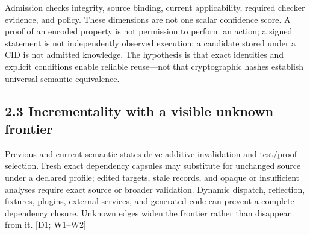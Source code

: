 Admission checks integrity, source binding, current applicability, required checker evidence, and
policy. These dimensions are not one scalar confidence score. A proof of an encoded property is
not permission to perform an action; a signed statement is not independently observed execution; a
candidate stored under a CID is not admitted knowledge. The hypothesis is that exact identities and
explicit conditions enable reliable reuse—not that cryptographic hashes establish universal semantic
equivalence.

\subsection*{2.3 Incrementality with a visible unknown frontier}

Previous and current semantic states drive additive invalidation and test/proof selection. Fresh exact
dependency capsules may substitute for unchanged source under a declared profile; edited targets,
stale records, and opaque or insufficient analyses require exact source or broader validation. Dynamic
dispatch, reflection, fixtures, plugins, external services, and generated code can prevent a complete
dependency closure. Unknown edges widen the frontier rather than disappear from it. [D1; W1–W2]


